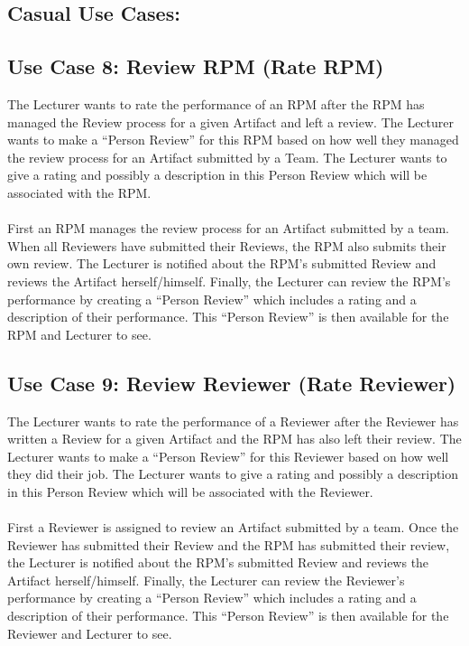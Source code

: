     
    
    
    
    
    
    
    
    \subsection{Casual Use Cases:}
    
    \subsection*{Use Case 8: Review RPM (Rate RPM)}
    The Lecturer wants to rate the performance of an RPM after the RPM has managed the Review process for a given Artifact and left a review. The Lecturer wants to make a “Person Review” for this RPM based on how well they managed the review process for an Artifact submitted by a Team. The Lecturer wants to give a rating and possibly a description in this Person Review which will be associated with the RPM.
    \\
    \\
    First an RPM manages the review process for an Artifact submitted by a team. When all Reviewers have submitted their Reviews, the RPM also submits their own review. The Lecturer is notified about the RPM’s submitted Review and reviews the Artifact herself/himself. Finally, the Lecturer can review the RPM’s performance by creating a “Person Review” which includes a rating and a description of their performance. This “Person Review” is then available for the RPM and Lecturer to see.
    
    
    \subsection*{Use Case 9: Review Reviewer (Rate Reviewer) }
    The Lecturer wants to rate the performance of a Reviewer after the Reviewer has written a Review for a given Artifact and the RPM has also left their review. The Lecturer wants to make a “Person Review” for this Reviewer based on how well they did their job. The Lecturer wants to give a rating and possibly a description in this Person Review which will be associated with the Reviewer.
    \\
    \\
    First a Reviewer is assigned to review an Artifact submitted by a team. Once the Reviewer has submitted their Review and the RPM has submitted their review, the Lecturer is notified about the RPM’s submitted Review and reviews the Artifact herself/himself. Finally, the Lecturer can review the Reviewer’s performance by creating a “Person Review” which includes a rating and a description of their performance. This “Person Review” is then available for the Reviewer and Lecturer to see.
    
